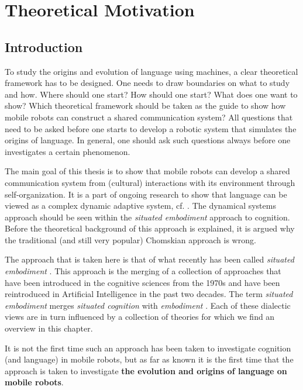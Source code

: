 
\chapter{Theoretical Motivation}\label{ch:theory}

\section{Introduction}

To study the origins and evolution of language using machines, a clear theoretical framework has to be designed. One needs to draw boundaries on what to study and how. Where should one start? How should one start? What does one want to show? Which theoretical framework should be taken as the guide to show how mobile robots can construct a shared communication system? All questions that need to be asked before one starts to develop a robotic system that simulates the origins of language. In general, one should ask such questions always before one investigates a certain phenomenon.

The main goal of this thesis is to show that mobile robots can develop a shared communication system from (cultural) interactions with its environment through self-organization. It is a part of ongoing research to show that language can be viewed as a complex dynamic adaptive system, cf. \cite{steels:1997b}. The dynamical systems approach should be seen within the {\em situated embodiment} approach to cognition. Before the theoretical background of this approach is explained, it is argued why the traditional (and still very popular) Chomskian approach is wrong.


The approach that is taken here is that of what recently has been called {\em situated embodiment} \cite{zlatev:1997}. This approach is the merging of a collection of approaches that have been introduced in the cognitive sciences from the 1970s and have been reintroduced in Artificial Intelligence in the past two decades. The term {\em situated embodiment} merges {\em situated cognition} \cite{clancey:1997} with {\em embodiment} \cite{lakoff:1987}. Each of these dialectic views are in turn influenced by a collection of theories for which we find an overview in this chapter.

It is not the first time such an approach has been taken to investigate cognition (and language) in mobile robots, but as far as known it is the first time that the approach is taken to investigate {\bf the evolution and origins of language on mobile robots}.

